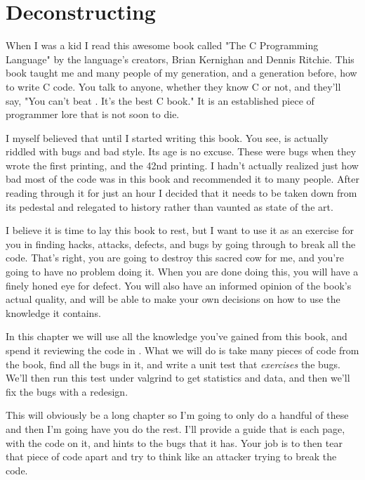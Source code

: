 \chapter{Deconstructing \krc}

When I was a kid I read this awesome book called "The C Programming Language"
by the language's creators, Brian Kernighan and Dennis Ritchie.  This book 
taught me and many people of my generation, and a generation before, how to
write C code.  You talk to anyone, whether they know C or not, and they'll
say, "You can't beat \krc. It's the best C book."  It is an established
piece of programmer lore that is not soon to die.

I myself believed that until I started writing this book. You see, \krc is
actually riddled with bugs and bad style.  Its age is no excuse. These were
bugs when they wrote the first printing, and the 42nd printing.  I hadn't
actually realized just how bad most of the code was in this book and recommended
it to many people.  After reading through it for just an hour I decided that it
needs to be taken down from its pedestal and relegated to history rather than
vaunted as state of the art.

I believe it is time to lay this book to rest, but I want to use it as an
exercise for you in finding hacks, attacks, defects, and bugs by going through
\krc to break all the code.  That's right, you are going to destroy this
sacred cow for me, and you're going to have no problem doing it.  When you are
done doing this, you will have a finely honed eye for defect.  You will also
have an informed opinion of the book's actual quality, and will be able to make
your own decisions on how to use the knowledge it contains.

In this chapter we will use all the knowledge you've gained from
this book, and spend it reviewing the code in \krc.  What we will do is
take many pieces of code from the book, find all the bugs in it, and write
a unit test that \emph{exercises} the bugs.  We'll then run this test under
valgrind to get statistics and data, and then we'll fix the bugs with a redesign.

This will obviously be a long chapter so I'm going to only do a handful of
these and then I'm going have you do the rest.  I'll provide a guide that is
each page, with the code on it, and hints to the bugs that it has.  Your job is
to then tear that piece of code apart and try to think like an attacker trying
to break the code.

